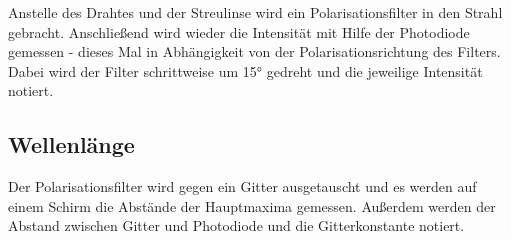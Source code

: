 Anstelle des Drahtes und der Streulinse wird ein Polarisationsfilter in den Strahl gebracht. Anschließend wird wieder die Intensität
mit Hilfe der Photodiode gemessen - dieses Mal in Abhängigkeit von der Polarisationsrichtung des Filters. Dabei wird der
Filter schrittweise um 15° gedreht und die jeweilige Intensität notiert.

\subsection{Wellenlänge}

Der Polarisationsfilter wird gegen ein Gitter ausgetauscht und es werden auf einem Schirm die Abstände der Hauptmaxima gemessen.
Außerdem werden der Abstand zwischen Gitter und Photodiode und die Gitterkonstante notiert.
